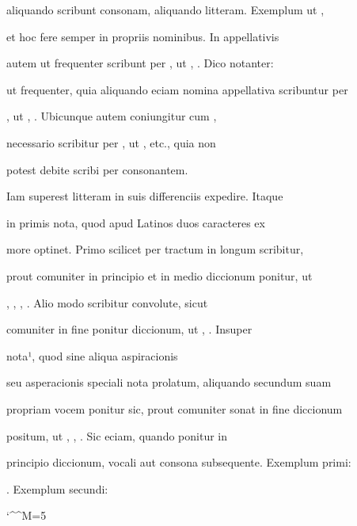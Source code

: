 aliquando scribunt  consonam, aliquando  litteram. Exemplum ut ,

 et hoc fere semper in propriis nominibus. In appellativis

autem ut frequenter scribunt per , ut , . Dico notanter:

ut frequenter, quia aliquando eciam nomina appellativa scribuntur per

, ut , . Ubicunque autem  coniungitur cum ,

necessario scribitur per , ut ,  etc., quia non


potest debite scribi per  consonantem.


\indentK Iam superest  litteram in suis differenciis expedire. Itaque

\fulllines

in primis nota, quod  apud Latinos duos caracteres ex

more optinet. Primo scilicet per tractum in longum scribitur,

prout comuniter in principio et in medio diccionum ponitur, ut

, , , . Alio modo scribitur convolute, sicut

comuniter in fine ponitur diccionum, ut , . Insuper

nota¹, quod  sine aliqua aspiracionis

seu asperacionis speciali nota prolatum, aliquando secundum suam

propriam vocem ponitur sic, prout comuniter sonat in fine diccionum

positum, ut , , . Sic eciam, quando ponitur in

principio diccionum, vocali aut consona subsequente. Exemplum primi: 

    . Exemplum secundi: 

\splitlines

\catcode `\^^M=5
\obeylines

